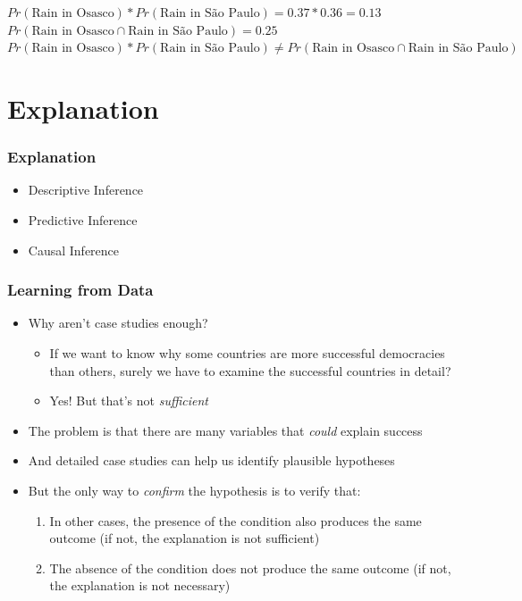 \documentclass[xcolor=x11names,compress]{beamer}\usepackage[]{graphicx}\usepackage[]{color}
\newenvironment{knitrout}{}{} %
\renewcommand{\(}{\begin{columns}}
\renewcommand{\)}{\end{columns}}
\newcommand{\<}[1]{\begin{column}{#1}}
\renewcommand{\>}{\end{column}}
\begin{document}
\begin{frame}
\begin{multicols}{2}
\begin{knitrout}
\end{knitrout}
\footnotesize
$Pr(\text{Rain in Osasco})*Pr(\text{Rain in S\~{a}o Paulo}) = 0.37 * 0.36 = 0.13$ \\
$Pr(\text{Rain in Osasco} \cap  \text{Rain in S\~{a}o Paulo}) = 0.25$ \\
$Pr(\text{Rain in Osasco})*Pr(\text{Rain in S\~{a}o Paulo}) \neq Pr(\text{Rain in Osasco} \cap  \text{Rain in S\~{a}o Paulo})$ \\
\normalsize
\end{multicols}
\end{frame}

\section{Explanation}

\begin{frame}
\frametitle{Explanation}
\begin{itemize}
\item Descriptive Inference
\item Predictive Inference
\item Causal Inference
\end{itemize}
\end{frame}


\begin{frame}
\frametitle{Learning from Data}
\begin{itemize}
\item Why aren't case studies enough?
\pause
\begin{itemize}
\item If we want to know why some countries are more successful democracies than others, surely we have to examine the successful countries in detail?
\pause
\item Yes! But that's not \textit{sufficient}
\pause
\end{itemize}
\item The problem is that there are many variables that \textit{could} explain success
\pause
\item And detailed case studies can help us identify plausible hypotheses
\pause
\item But the only way to \textit{confirm} the hypothesis is to verify that:
\pause
\begin{enumerate}
\item In other cases, the presence of the condition also produces the same outcome (if not, the explanation is not sufficient)
\pause
\item The absence of the condition does not produce the same outcome (if not, the explanation is not necessary)
\end{enumerate}
\end{itemize}
\end{frame}
\end{document}
